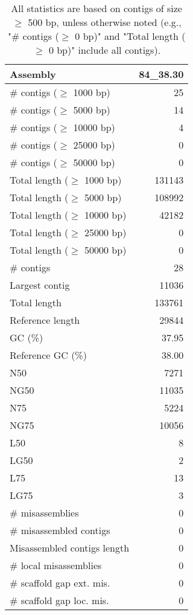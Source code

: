 \documentclass[12pt,a4paper]{article}
\begin{document}
\begin{table}[ht]
\begin{center}
\caption{All statistics are based on contigs of size $\geq$ 500 bp, unless otherwise noted (e.g., "\# contigs ($\geq$ 0 bp)" and "Total length ($\geq$ 0 bp)" include all contigs).}
\begin{tabular}{|l*{1}{|r}|}
\hline
Assembly & 84\_38.30 \\ \hline
\# contigs ($\geq$ 1000 bp) & 25 \\ \hline
\# contigs ($\geq$ 5000 bp) & 14 \\ \hline
\# contigs ($\geq$ 10000 bp) & 4 \\ \hline
\# contigs ($\geq$ 25000 bp) & 0 \\ \hline
\# contigs ($\geq$ 50000 bp) & 0 \\ \hline
Total length ($\geq$ 1000 bp) & 131143 \\ \hline
Total length ($\geq$ 5000 bp) & 108992 \\ \hline
Total length ($\geq$ 10000 bp) & 42182 \\ \hline
Total length ($\geq$ 25000 bp) & 0 \\ \hline
Total length ($\geq$ 50000 bp) & 0 \\ \hline
\# contigs & 28 \\ \hline
Largest contig & 11036 \\ \hline
Total length & 133761 \\ \hline
Reference length & 29844 \\ \hline
GC (\%) & 37.95 \\ \hline
Reference GC (\%) & 38.00 \\ \hline
N50 & 7271 \\ \hline
NG50 & 11035 \\ \hline
N75 & 5224 \\ \hline
NG75 & 10056 \\ \hline
L50 & 8 \\ \hline
LG50 & 2 \\ \hline
L75 & 13 \\ \hline
LG75 & 3 \\ \hline
\# misassemblies & 0 \\ \hline
\# misassembled contigs & 0 \\ \hline
Misassembled contigs length & 0 \\ \hline
\# local misassemblies & 0 \\ \hline
\# scaffold gap ext. mis. & 0 \\ \hline
\# scaffold gap loc. mis. & 0 \\ \hline

\end{tabular}
\end{center}
\end{table}
\end{document}
